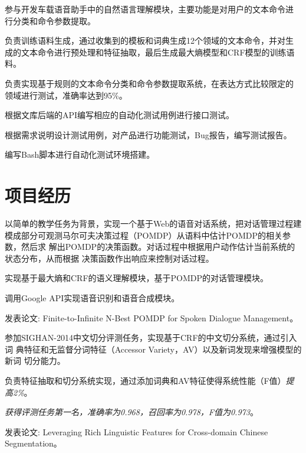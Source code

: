 \documentclass[11pt,a4paper]{cjkresume}
\begin{document}
\begin{workitemize}
  \item 参与开发车载语音助手中的自然语言理解模块，主要功能是对用户的文本命令进
    行分类和命令参数提取。
  \item 负责训练语料生成，通过收集到的模板和词典生成12个领域的文本命令，并对生
    成的文本命令进行预处理和特征抽取，最后生成最大熵模型和CRF模型的训练语料。
  \item 负责实现基于规则的文本命令分类和命令参数提取系统，在表达方式比较限定的
    领域进行测试，准确率达到95\%。
\end{workitemize}

\begin{workitemize}
  \item 根据文库后端的API编写相应的自动化测试用例进行接口测试。
  \item 根据需求说明设计测试用例，对产品进行功能测试，Bug报告，编写测试报告。
  \item 编写Bash脚本进行自动化测试环境搭建。
\end{workitemize}

\section{项目经历}

\begin{workitemize}
  \item 以简单的教学任务为背景，实现一个基于Web的语音对话系统，把对话管理过程建
    模成部分可观测马尔可夫决策过程（POMDP）从语料中估计POMDP的相关参数，然后求
    解出POMDP的决策函数。对话过程中根据用户动作估计当前系统的状态分布，从而根据
    决策函数作出响应来控制对话过程。
  \item 实现基于最大熵和CRF的语义理解模块，基于POMDP的对话管理模块。
  \item 调用Google API实现语音识别和语音合成模块。
  \item 发表论文: Finite-to-Infinite N-Best POMDP for Spoken Dialogue Management。
\end{workitemize}

\begin{workitemize}
  \item 参加SIGHAN-2014中文切分评测任务，实现基于CRF的中文切分系统，通过引入词
    典特征和无监督分词特征（Accessor Variety，AV）以及新词发现来增强模型的新词
    切分能力。
  \item 负责特征抽取和切分系统实现，通过添加词典和AV特征使得系统性能（F值）\emph{提高2\%}。
  \item \emph{获得评测任务第一名，准确率为0.968，召回率为0.978，F值为0.973}。
  \item 发表论文: Leveraging Rich Linguistic Features for Cross-domain Chinese Segmentation。
\end{workitemize}
\end{document}
